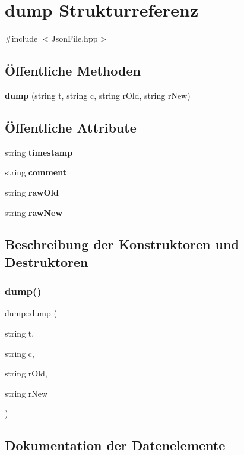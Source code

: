 \section{dump Strukturreferenz}
\label{structdump}


{\ttfamily \#include $<$Json\+File.\+hpp$>$}

\subsection*{Öffentliche Methoden}
\begin{DoxyCompactItemize}
\item 
\textbf{ dump} (string t, string c, string r\+Old, string r\+New)
\end{DoxyCompactItemize}
\subsection*{Öffentliche Attribute}
\begin{DoxyCompactItemize}
\item 
string \textbf{ timestamp}
\item 
string \textbf{ comment}
\item 
string \textbf{ raw\+Old}
\item 
string \textbf{ raw\+New}
\end{DoxyCompactItemize}


\subsection{Beschreibung der Konstruktoren und Destruktoren}
\mbox{\label{structdump_ad10ec8e481ebe0cb1e57ea14449265b8}} 
\subsubsection{dump()}
{\footnotesize\ttfamily dump\+::dump (\begin{DoxyParamCaption}\item[{string}]{t,  }\item[{string}]{c,  }\item[{string}]{r\+Old,  }\item[{string}]{r\+New }\end{DoxyParamCaption})\hspace{0.3cm}{\ttfamily [inline]}}



\subsection{Dokumentation der Datenelemente}
\mbox{\label{structdump_a867553443d445b0afc8dfc103c99a348}} 
